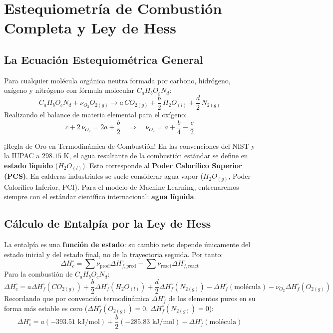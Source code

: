 \documentclass[11pt,letterpaper]{report}
\begin{document}
\section{Estequiometría de Combustión Completa y Ley de Hess}

\subsection{La Ecuación Estequiométrica General}
Para cualquier molécula orgánica neutra formada por carbono, hidrógeno, oxígeno y nitrógeno con fórmula molecular $C_a H_b O_c N_d$:
\begin{equation}
    C_a H_b O_c N_d + \nu_{O_2} O_{2(g)} \longrightarrow a\, CO_{2(g)} + \frac{b}{2}\, H_2O_{(l)} + \frac{d}{2}\, N_{2(g)}
\end{equation}
Realizando el balance de materia elemental para el oxígeno:
\begin{equation}
    c + 2\,\nu_{O_2} = 2a + \frac{b}{2} \quad \Longrightarrow \quad \nu_{O_2} = a + \frac{b}{4} - \frac{c}{2}
\end{equation}

\begin{warningbox}{¡Regla de Oro en Termodinámica de Combustión!}
En las convenciones del NIST y la IUPAC a $298.15\text{ K}$, el agua resultante de la combustión estándar se define en \textbf{estado líquido} ($H_2O_{(l)}$). Esto corresponde al \textbf{Poder Calorífico Superior (PCS)}. En calderas industriales se suele considerar agua vapor ($H_2O_{(g)}$, Poder Calorífico Inferior, PCI). Para el modelo de Machine Learning, entrenaremos siempre con el estándar científico internacional: \textbf{agua líquida}.
\end{warningbox}

\subsection{Cálculo de Entalpía por la Ley de Hess}
La entalpía es una \textbf{función de estado}: su cambio neto depende únicamente del estado inicial y del estado final, no de la trayectoria seguida. Por tanto:
\begin{equation}
    \Delta H_c^\circ = \sum \nu_{\text{prod}} \Delta H_{f,\text{prod}}^\circ - \sum \nu_{\text{react}} \Delta H_{f,\text{react}}^\circ
\end{equation}
Para la combustión de $C_a H_b O_c N_d$:
\begin{equation}
    \Delta H_c^\circ = a \Delta H_f^\circ(CO_{2(g)}) + \frac{b}{2} \Delta H_f^\circ(H_2O_{(l)}) + \frac{d}{2} \Delta H_f^\circ(N_{2(g)}) - \Delta H_f^\circ(\text{mol\'ecula}) - \nu_{O_2} \Delta H_f^\circ(O_{2(g)})
\end{equation}
Recordando que por convención termodinámica $\Delta H_f^\circ$ de los elementos puros en su forma más estable es cero ($\Delta H_f^\circ(O_{2(g)}) = 0$, $\Delta H_f^\circ(N_{2(g)}) = 0$):
\begin{equation}
    \Delta H_c^\circ = a (-393.51\text{ kJ/mol}) + \frac{b}{2} (-285.83\text{ kJ/mol}) - \Delta H_f^\circ(\text{mol\'ecula})
\end{equation}
\end{document}
